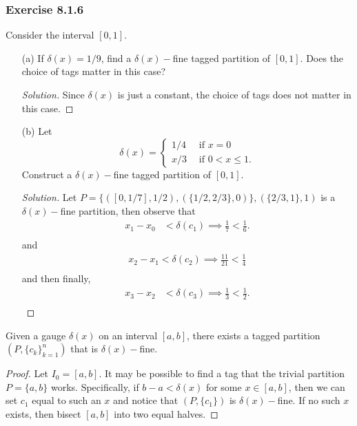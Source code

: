 \subsubsection{Exercise 8.1.6} Consider the interval \( [0,1]  \). 
\begin{enumerate}
    \item[(a)] If \( \delta(x) = 1/ 9 \), find a \( \delta(x)-\)fine tagged partition of \( [0,1]  \). Does the choice of tags matter in this case? 
        \begin{proof}[Solution]
        Since \( \delta(x) \) is just a constant, the choice of tags does not matter in this case.
        \end{proof}
    \item[(b)] Let 
        \[ \delta(x) = 
        \begin{cases}
            1/4 \ &\text{ if } x = 0 \\
            x/3  &\text{ if  } 0  < x \leq 1.
        \end{cases}  \]
        Construct a \( \delta(x)- \)fine tagged partition of \( [0,1] \).  
    \begin{proof}[Solution]
        Let \( P = \{ ([0, 1/7], 1/2), (\{ 1/2, 2/3 \}, 0 ) \}, (\{ 2/3, 1 \}, 1) \) is a \( \delta(x)- \)fine partition, then observe that 
        \begin{align*}
            x_{1} - x_{0} &< \delta(c_{1}) \implies \frac{ 1 }{ 7 } < \frac{ 1 }{ 6 }. \\
        \end{align*}
        and 
        \begin{align*}
            x_{2} - x_{1} < \delta(c_{2}) \implies \frac{ 11 }{ 21 } < \frac{ 1 }{ 4 } \\
        \end{align*}
        and then finally, 
        \begin{align*}
            x_{3} - x_{2} &< \delta(c_{3}) \implies \frac{ 1 }{ 3 } < \frac{ 1 }{ 2 }. \\
        \end{align*}

    \end{proof}
\end{enumerate}

\begin{tcolorbox}
\begin{thm}
    Given a gauge \( \delta(x)  \) on an interval \( [a,b]  \), there exists a tagged partition \( (P, \{ c_{k }  \}_{k=1}^{n}) \) that is \( \delta(x)- \)fine.
\end{thm}
\end{tcolorbox}
\begin{proof}
    Let \( I_{0} = [a,b]  \). It may be possible to find a tag that the trivial partition \( P = \{ a,b  \}  \) works. Specifically, if \( b-a < \delta(x)  \) for some \( x \in [a,b]  \), then we can set \( c_{1} \) equal to such an \( x  \) and notice that \( (P, \{ c_{1} \} ) \) is \( \delta(x)-\)fine. If no such \( x  \) exists, then bisect \( [a,b] \) into two equal halves.
\end{proof}

